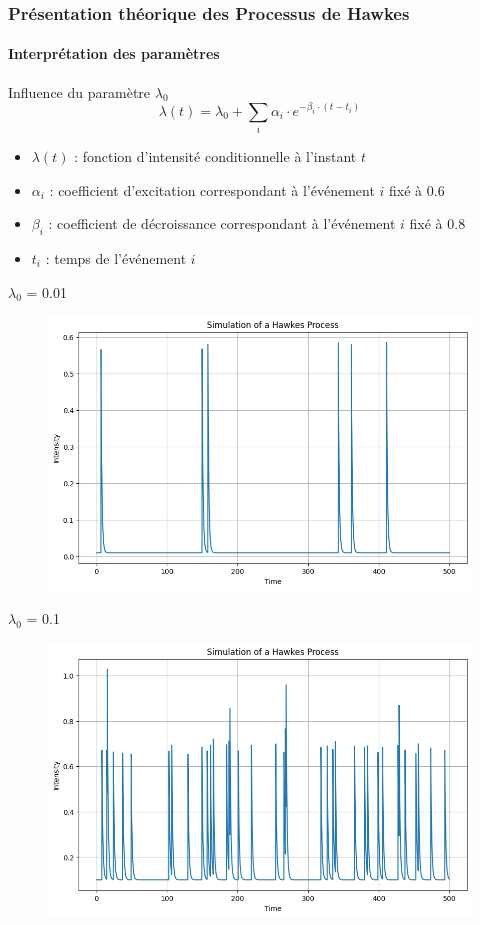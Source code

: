 \begin{frame}
    \frametitle{Présentation théorique des Processus de Hawkes}
    \framesubtitle{Interprétation des paramètres}

    \begin{block}{Influence du paramètre $\lambda_0$ }
    \[ \lambda(t) = \lambda_0 + \sum_i \alpha_i \cdot e^{-\beta_i \cdot (t - t_i)} \]

    \begin{itemize}
            \item $\lambda(t)$ : fonction d'intensité conditionnelle à l'instant $t$
            \item $\alpha_i$ : coefficient d'excitation correspondant à l'événement $i$ fixé à 0.6
            \item $\beta_i$ : coefficient de décroissance correspondant à l'événement $i$ fixé à 0.8
            \item $t_i$ : temps de l'événement $i$
        \end{itemize}

    \end{block}
\end{frame}
\begin{frame}
    \begin{block}{$\lambda_0$ = 0.01}
    \begin{figure}[h]
        \centering
        \includegraphics[width=0.6\linewidth]{figures/lamba1.png}
    \end{figure}
    \end{block}
\end{frame}

\begin{frame}
    \begin{block}{$\lambda_0$ = 0.1}
    \begin{figure}[h]
        \centering
        \includegraphics[width=0.6\linewidth]{figures/lambda2.png}
    \end{figure}
    \end{block}
\end{frame}

